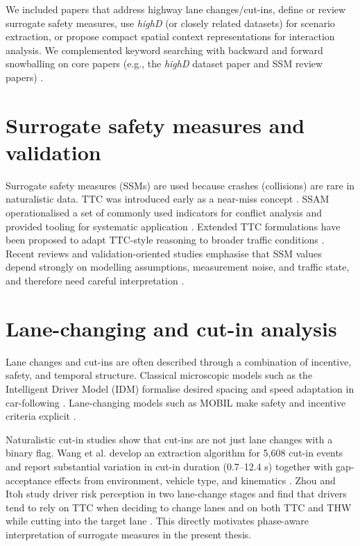 \documentclass[12pt,a4paper,twoside,openright]{report}
\begin{document}
    We included papers that address highway lane changes/cut-ins, define or review surrogate safety measures, use \textit{highD} (or closely related datasets) for scenario extraction, or propose compact spatial context representations for interaction analysis. We complemented keyword searching with backward and forward snowballing on core papers (e.g., the \textit{highD} dataset paper and SSM review papers) \cite{wohlin2014}.

    \section{Surrogate safety measures and validation}
    Surrogate safety measures (SSMs) are used because crashes (collisions) are rare in naturalistic data. TTC was introduced early as a near-miss concept \cite{hayward1972}. SSAM operationalised a set of commonly used indicators for conflict analysis and provided tooling for systematic application \cite{ssam2008}. Extended TTC formulations have been proposed to adapt TTC-style reasoning to broader traffic conditions \cite{minderhoud2001}. Recent reviews and validation-oriented studies emphasise that SSM values depend strongly on modelling assumptions, measurement noise, and traffic state, and therefore need careful interpretation \cite{wang2021ssm,johnsson2021validation}.

    \section{Lane-changing and cut-in analysis}
    Lane changes and cut-ins are often described through a combination of incentive, safety, and temporal structure. Classical microscopic models such as the Intelligent Driver Model (IDM) formalise desired spacing and speed adaptation in car-following \cite{treiber2000idm}. Lane-changing models such as MOBIL make safety and incentive criteria explicit \cite{kesting2007mobil}.

    Naturalistic cut-in studies show that cut-ins are not just lane changes with a binary flag. Wang et al. develop an extraction algorithm for 5,608 cut-in events and report substantial variation in cut-in duration (0.7--12.4 s) together with gap-acceptance effects from environment, vehicle type, and kinematics \cite{wang2019cutin}. Zhou and Itoh study driver risk perception in two lane-change stages and find that drivers tend to rely on TTC when deciding to change lanes and on both TTC and THW while cutting into the target lane \cite{zhou2016riskperception}. This directly motivates phase-aware interpretation of surrogate measures in the present thesis.
\end{document}

